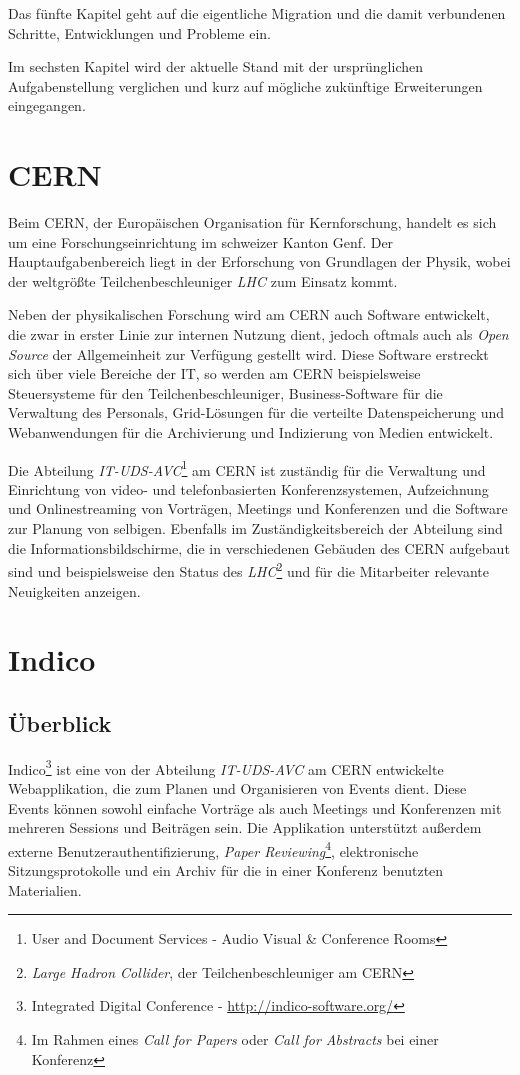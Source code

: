 Das fünfte Kapitel geht auf die eigentliche Migration und die damit verbundenen Schritte,
Entwicklungen und Probleme ein.

Im sechsten Kapitel wird der aktuelle Stand mit der ursprünglichen Aufgabenstellung verglichen und
kurz auf mögliche zukünftige Erweiterungen eingegangen.


\section{CERN}

Beim CERN, der Europäischen Organisation für Kernforschung, handelt es sich um eine
Forschungseinrichtung im schweizer Kanton Genf. Der Hauptaufgabenbereich liegt in der Erforschung
von Grundlagen der Physik, wobei der weltgrößte Teilchenbeschleuniger \emph{LHC} zum Einsatz kommt.

Neben der physikalischen Forschung wird am CERN auch Software entwickelt, die zwar in erster Linie
zur internen Nutzung dient, jedoch oftmals auch als \emph{Open Source} der Allgemeinheit zur Verfügung
gestellt wird. Diese Software erstreckt sich über viele Bereiche der IT, so werden am CERN
beispielsweise Steuersysteme für den Teilchenbeschleuniger, Business-Software für die Verwaltung des
Personals, Grid-Lösungen für die verteilte Datenspeicherung und Webanwendungen für die Archivierung
und Indizierung von Medien entwickelt.

Die Abteilung \emph{IT-UDS-AVC}\footnote{User and Document Services - Audio Visual \& Conference
Rooms} am CERN ist zuständig für die Verwaltung und Einrichtung von video- und telefonbasierten
Konferenzsystemen, Aufzeichnung und Onlinestreaming von Vorträgen, Meetings und Konferenzen und die
Software zur Planung von selbigen. Ebenfalls im Zuständigkeitsbereich der Abteilung sind
die Informationsbildschirme, die in verschiedenen Gebäuden des CERN aufgebaut sind und beispielsweise
den Status des \emph{LHC}\footnote{\emph{Large Hadron Collider}, der Teilchenbeschleuniger am CERN} und
für die Mitarbeiter relevante Neuigkeiten anzeigen.


\section{Indico}

\subsection{Überblick}
Indico\footnote{Integrated Digital Conference - \href{http://indico-software.org/}{http://indico-software.org/}}
ist eine von der Abteilung \emph{IT-UDS-AVC} am CERN entwickelte Webapplikation, die zum Planen und Organisieren von Events dient. Diese
Events können sowohl einfache Vorträge als auch Meetings und Konferenzen mit mehreren Sessions und
Beiträgen sein. Die Applikation unterstützt außerdem externe Benutzerauthentifizierung, \emph{Paper
Reviewing}\footnote{Im Rahmen eines \emph{Call for Papers} oder \emph{Call for Abstracts} bei einer
Konferenz}, elektronische Sitzungsprotokolle und ein Archiv für die in einer Konferenz benutzten
Materialien. \citep{indico}

